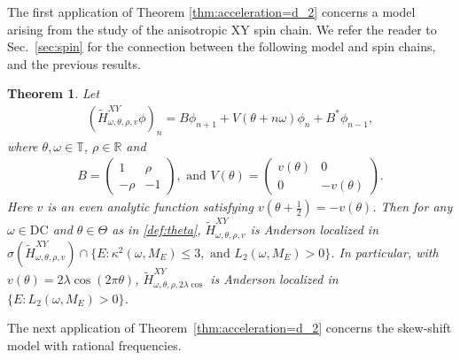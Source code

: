 \documentclass[11pt]{amsart}
\newtheorem{theorem}{Theorem}[section]
\newcommand{\R}{\mathbb R}
\newcommand{\T}{\mathbb T}
\begin{document}
The first application of Theorem \ref{thm:acceleration=d_2} concerns a model arising from the study of the anisotropic XY spin chain. We refer the reader to  Sec.~\ref{sec:spin} for the connection between the following model and spin chains, and the previous results. 
\begin{theorem}\label{thm:XY}
    Let 
\begin{align}\label{def:HXY}
(\widetilde{H}^{XY}_{\omega,\theta,\rho,v}\phi)_n=B \phi_{n+1}+V(\theta+n\omega) \phi_n+B^* \phi_{n-1},
\end{align}
where $\theta,\omega\in \T$, $\rho\in \R$ and
\begin{align}
    B=\left(\begin{matrix}1 &\rho\\ -\rho &-1\end{matrix}\right), \text{ and\ \  } V(\theta)=\left(\begin{matrix} v(\theta) &0 \\ 0 &-v(\theta)\end{matrix}\right).
\end{align}
Here $v$ is an even analytic function satisfying $v(\theta+\frac{1}{2})=-v(\theta)$.
Then for any $\omega\in \mathrm{DC}$ and $\theta\in \Theta$ as in \eqref{def:theta}, $\widetilde{H}_{\omega,\theta,\rho,v}^{XY}$ is Anderson localized in $\sigma(\widetilde{H}^{XY}_{\omega,\theta,\rho,v})\cap\{E: \kappa^2(\omega,M_E)\leq 3, \text{ and } L_2(\omega,M_E)>0\}$.
In particular, with $v(\theta)=2\lambda\cos(2\pi\theta)$, $\widetilde{H}^{XY}_{\omega,\theta,\rho,2\lambda\cos}$ is Anderson localized in $\{E: L_2(\omega,M_E)>0\}$.
\end{theorem}

The next application of Theorem~\ref{thm:acceleration=d_2} concerns the skew-shift model with rational frequencies.
\end{document}

